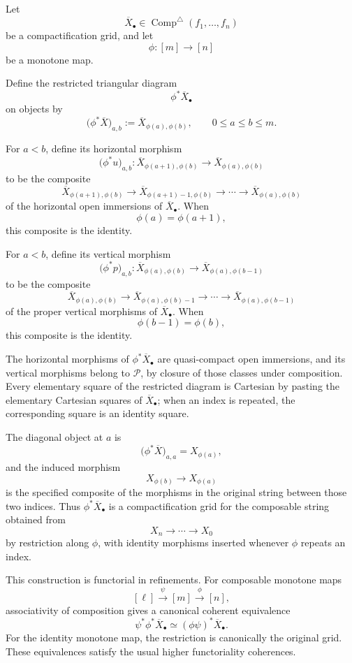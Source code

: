 \begin{construction}
\label{constr:restriction-finite-compactification-grids}
Let
\[
    \overline X_\bullet
    \in
    \operatorname{Comp}^{\triangle}
    (f_1,\ldots,f_n)
\]
be a compactification grid, and let
\[
    \phi:[m]\longrightarrow[n]
\]
be a monotone map.

Define the restricted triangular diagram
\[
    \phi^*\overline X_\bullet
\]
on objects by
\[
    \bigl(
      \phi^*\overline X
    \bigr)_{a,b}
    :=
    \overline X_{\phi(a),\phi(b)},
    \qquad
    0\leq a\leq b\leq m.
\]

For \(a<b\), define its horizontal morphism
\[
    \bigl(
      \phi^*u
    \bigr)_{a,b}:
    \overline X_{\phi(a+1),\phi(b)}
    \longrightarrow
    \overline X_{\phi(a),\phi(b)}
\]
to be the composite
\[
    \overline X_{\phi(a+1),\phi(b)}
    \longrightarrow
    \overline X_{\phi(a+1)-1,\phi(b)}
    \longrightarrow
    \cdots
    \longrightarrow
    \overline X_{\phi(a),\phi(b)}
\]
of the horizontal open immersions of
\(\overline X_\bullet\).  When
\[
    \phi(a)=\phi(a+1),
\]
this composite is the identity.

For \(a<b\), define its vertical morphism
\[
    \bigl(
      \phi^*p
    \bigr)_{a,b}:
    \overline X_{\phi(a),\phi(b)}
    \longrightarrow
    \overline X_{\phi(a),\phi(b-1)}
\]
to be the composite
\[
    \overline X_{\phi(a),\phi(b)}
    \longrightarrow
    \overline X_{\phi(a),\phi(b)-1}
    \longrightarrow
    \cdots
    \longrightarrow
    \overline X_{\phi(a),\phi(b-1)}
\]
of the proper vertical morphisms of
\(\overline X_\bullet\).  When
\[
    \phi(b-1)=\phi(b),
\]
this composite is the identity.

The horizontal morphisms of
\(\phi^*\overline X_\bullet\) are quasi-compact open immersions, and its
vertical morphisms belong to \(\mathcal P\), by closure of those classes
under composition.  Every elementary square of the restricted diagram is
Cartesian by pasting the elementary Cartesian squares of
\(\overline X_\bullet\); when an index is repeated, the corresponding
square is an identity square.

The diagonal object at \(a\) is
\[
    \bigl(
      \phi^*\overline X
    \bigr)_{a,a}
    =
    X_{\phi(a)},
\]
and the induced morphism
\[
    X_{\phi(b)}
    \longrightarrow
    X_{\phi(a)}
\]
is the specified composite of the morphisms in the original string between
those two indices.  Thus
\(\phi^*\overline X_\bullet\) is a compactification grid for the
composable string obtained from
\[
    X_n\longrightarrow\cdots\longrightarrow X_0
\]
by restriction along \(\phi\), with identity morphisms inserted whenever
\(\phi\) repeats an index.

This construction is functorial in refinements.  For composable monotone
maps
\[
    [\ell]\xrightarrow{\psi}[m]\xrightarrow{\phi}[n],
\]
associativity of composition gives a canonical coherent equivalence
\[
    \psi^*\phi^*\overline X_\bullet
    \simeq
    (\phi\psi)^*\overline X_\bullet.
\]
For the identity monotone map, the restriction is canonically the original
grid.  These equivalences satisfy the usual higher functoriality
coherences.
\end{construction}

